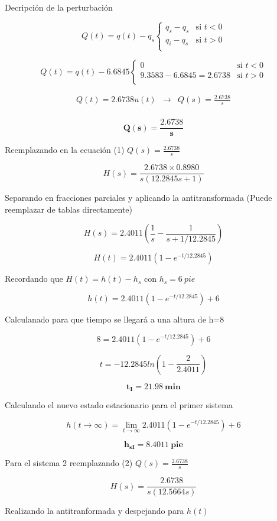\documentclass[
  letterpaper,
  DIV=11,
  numbers=noendperiod]{scrreprt}
\begin{document}
Decripción de la perturbación

\[
Q(t)= q(t)-q_s
\begin{cases}
   q_s-q_s&\text{si } t < 0 \\
   q_i-q_s &\text{si } t > 0\\
\end{cases}
\]

\[
Q(t)= q(t)-6.6845
\begin{cases}
   0&\text{si } t < 0 \\
   9.3583-6.6845=2.6738 &\text{si } t > 0\\
\end{cases}
\]

\[
\begin{array}{lcr}
Q(t)=2.6738u(t)&\rightarrow & Q(s)=\frac{2.6738}{s}\\
\end{array}
\]

\[
\mathbf{Q(s)=\frac{2.6738}{s}}
\]

Reemplazando en la ecuación (1) \(Q(s)=\frac{2.6738}{s}\)

\[
H(s)=\frac{2.6738\times 0.8980}{s(12.2845s+1)}
\]

Separando en fracciones parciales y aplicando la antitransformada (Puede
reemplazar de tablas directamente)

\[
H(s)=2.4011\left(\frac{1}{s}-\frac{1}{s+1/12.2845}\right)
\]

\[
H(t)=2.4011(1-e^{-t/12.2845})
\]

Recordando que \(H(t)=h(t)-h_s\) con \(h_s=6\ pie\)

\[
h(t)=2.4011(1-e^{-t/12.2845})+6
\]

Calculanado para que tiempo se llegará a una altura de h=8

\[
8=2.4011(1-e^{-t/12.2845})+6
\]

\[
t=-12.2845ln\left(1-\frac{2}{2.4011}\right)
\]

\[
\mathbf{t_I=21.98\ min}
\]

Calculando el nuevo estado estacionario para el primer sistema

\[
h(t\to\infty)=\lim_{t\to\infty}2.4011(1-e^{-t/12.2845})+6 
\]

\[
\mathbf{h_{sI}= 8.4011\ pie}
\]

Para el sistema 2 reemplazando (2) \(Q(s)=\frac{2.6738}{s}\)

\[
H(s)=\frac{2.6738}{s(12.5664s)}
\]

Realizando la antitranformada y despejando para \(h(t)\)
\end{document}
